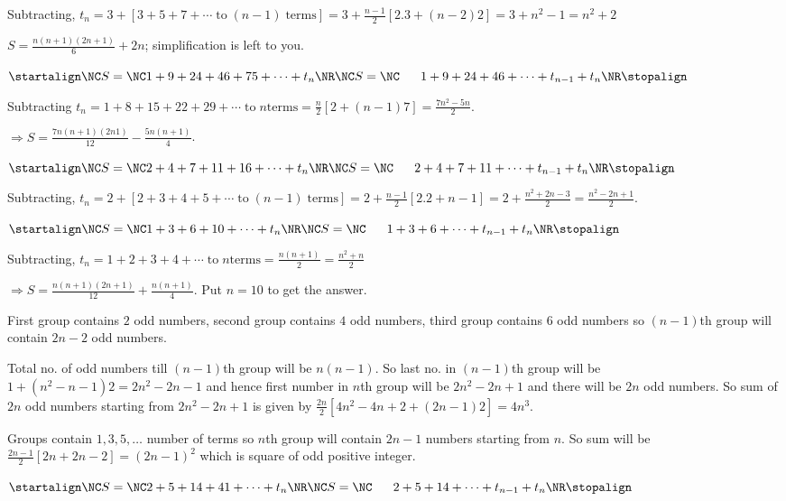   Subtracting,
  $t_n = 3 + [3 + 5 + 7 + \cdots\;\mathrm{to}\;(n - 1)\;\mathrm{terms}] = 3 + \frac{n - 1}{2}[2.3 + (n - 2)2]
    = 3 + n^2 - 1 = n^2 + 2$

  $S = \frac{n(n + 1)(2n + 1)}{6} + 2n$; simplification is left to you.
\item $\startalign\NC S = \NC 1 + 9 + 24 + 46 + 75 + \cdots + t_n\NR\NC S = \NC\;\;\;\;\;\;1 + 9 + 24 + 46 +
  \cdots + t_{n - 1} + t_n\NR\stopalign$

  Subtracting $t_n = 1 + 8 + 15 + 22 + 29 + \cdots\;\mathrm{to}\;n\mathrm{terms} = \frac{n}{2}[2 + (n - 1)7]
  = \frac{7n^2 - 5n}{2}$.

  $\Rightarrow S = \frac{7n(n + 1)(2n  1)}{12} - \frac{5n(n + 1)}{4}$.
\item $\startalign\NC S = \NC2 + 4 + 7 + 11 + 16 + \cdots + t_n\NR\NC S = \NC\;\;\;\;\;\;2 + 4 + 7 + 11 +
  \cdots + t_{n - 1} + t_n\NR\stopalign$

  Subtracting, $t_n = 2 + [2 + 3 + 4 + 5 + \cdots\;\mathrm{to}\;(n - 1)\;\mathrm{terms}] = 2 + \frac{n -
    1}{2}[2.2 + n - 1] = 2 + \frac{n^2 + 2n - 3}{2} = \frac{n^2 - 2n + 1}{2}$.
\item $\startalign\NC S = \NC 1 + 3 + 6 + 10 + \cdots + t_n\NR\NC S = \NC\;\;\;\;\;\;1 + 3 + 6 + \cdots +
  t_{n - 1} + t_n\NR\stopalign$

  Subtracting, $t_n = 1 + 2 + 3 + 4 + \cdots\;\mathrm{to}\;n\mathrm{terms} = \frac{n(n + 1)}{2} = \frac{n^2
    + n}{2}$

  $\Rightarrow S = \frac{n(n + 1)(2n + 1)}{12} + \frac{n(n + 1)}{4}$. Put $n = 10$ to get the answer.
\item First group contains $2$ odd numbers, second group contains $4$ odd numbers, third group contains $6$
  odd numbers so $(n - 1)$th group will contain $2n - 2$ odd numbers.

  Total no. of odd numbers till $(n - 1)$th group will be $n(n - 1)$. So last no. in $(n - 1)$th group will
  be $1 + (n^2 - n - 1)2 = 2n^2 - 2n - 1$ and hence first number in $n$th group will be $2n^2 - 2n + 1$ and
  there will be $2n$ odd numbers. So sum of $2n$ odd numbers starting from $2n^2 - 2n + 1$ is given by
  $\frac{2n}{2}[4n^2 - 4n + 2 + (2n - 1)2] = 4n^3$.
\item Groups contain $1, 3, 5, \ldots$ number of terms so $n$th group will contain $2n - 1$ numbers starting
  from $n$. So sum will be $\frac{2n - 1}{2}[2n + 2n - 2] = (2n - 1)^2$ which is square of odd positive
  integer.
\item $\startalign\NC S = \NC 2 + 5 + 14 + 41 + \cdots + t_n\NR\NC S = \NC\;\;\;\;\;\; 2 + 5 + 14 + \cdots +
  t_{n - 1} + t_n\NR\stopalign$

